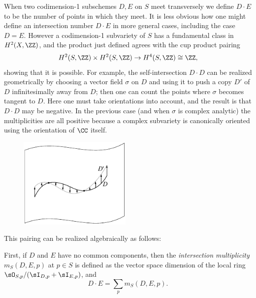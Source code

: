 When two codimension-1 subschemes $D,E$ on $S$ 
meet transversely we define $D\cdot E$ to be the number of points in which they meet.  
It is less obvious how one might define an intersection number $D\cdot E$ in more general cases,
including the case $D=E$. However 
a codimension-1 subvariety of $S$ has a 
%
fundamental class in $H^{2}(X,\ZZ)$, and the product just defined
agrees with the cup product pairing
%
$$
H^{2}(S,\ZZ) \times H^{2}(S,\ZZ) \to H^4(S,\ZZ)\cong \ZZ,
$$
showing that it is possible. For example, the self-intersection $D\cdot D$ can be realized geometrically
 by choosing a  vector field $\sigma$ on $D$ and using it to push a copy $D'$ of $D$ infinitesimally away from $D$; then
 one can count the points where $\sigma$ becomes tangent to $D$. Here one must take orientations into account,
 and the result is that $D\cdot D$ may be negative. In the previous case (and when $\sigma$ is complex analytic)
 the multiplicities are all positive because a complex subvariety is canonically oriented using the orientation of $\CC$
 itself.

\begin{figure}   %
\inprogress
\centerline {\includegraphics[height=1.75in]{"main/Fig02-strip"}}
\end{figure}

This pairing can be realized algebraically as follows:

First, if $D$ and $E$ have no common
%
components, then the \emph{intersection multiplicity} 
$m_S(D,E,p)$ at $p\in S$
is defined as the vector space dimension of the local ring $\sO_{S,p}/(\sI_{D,p}+\sI_{E,p})$, and 
$$
D\cdot E = \sum_p m_S(D,E,p).
$$

